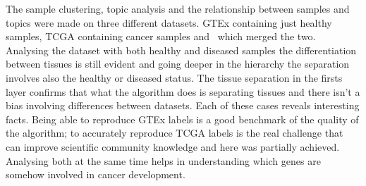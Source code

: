 The sample clustering, topic analysis and the relationship between samples and topics were made on three different datasets. GTEx containing just healthy samples, TCGA containing cancer samples and~\cite{Wang2017} which merged the two. Analysing the dataset with both healthy and diseased samples the differentiation between tissues is still evident and going deeper in the hierarchy the separation involves also the healthy or diseased status. The tissue separation in the firsts layer confirms that what the algorithm does is separating tissues and there isn't a bias involving differences between datasets.
\clearpage
Each of these cases reveals interesting facts. Being able to reproduce GTEx labels is a good benchmark of the quality of the algorithm; to accurately reproduce TCGA labels is the real challenge that can improve scientific community knowledge and here was partially achieved. Analysing both at the same time helps in understanding which genes are somehow involved in cancer development.